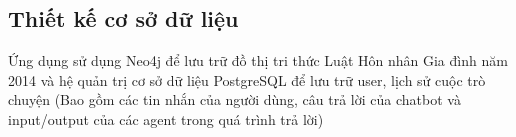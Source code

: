 \documentclass[../DoAn.tex]{subfiles}
\begin{document}




\subsection{Thiết kế cơ sở dữ liệu}
Ứng dụng sử dụng Neo4j để lưu trữ đồ thị tri thức Luật Hôn nhân Gia đình năm 2014 và hệ quản trị cơ sở dữ liệu PostgreSQL để lưu trữ user, lịch sử cuộc trò chuyện (Bao gồm các tin nhắn của người dùng, câu trả lời của chatbot và input/output của các agent trong quá trình trả lời)
\end{document}

